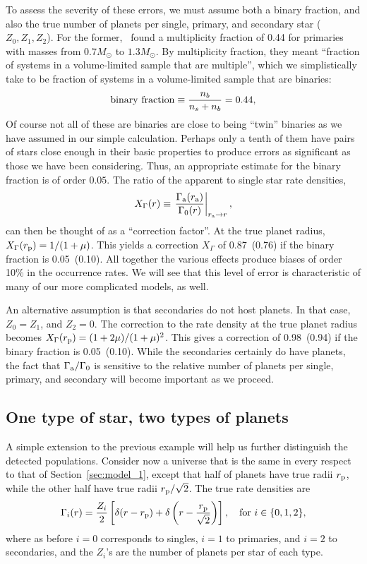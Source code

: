 \documentclass[12pt,modern]{aastex61}
\renewcommand{\a}{_{\rm a}}
\newcommand{\p}{_{\rm p}}
\begin{document}
To assess the severity of these errors, we must assume both a binary fraction, 
and also the true number of planets per single, primary, and secondary star 
($Z_0,Z_1,Z_2$).
For the former,~\citet{raghavan_survey_2010} found a multiplicity 
fraction of 0.44 for primaries with masses from $0.7M_\odot$ to $1.3M_\odot$.
By multiplicity fraction, they meant ``fraction of systems in a volume-limited 
sample that are multiple'', which we simplistically take to be fraction of 
systems in a volume-limited sample that are binaries:
\begin{equation}
{\rm binary\ fraction} \equiv \frac{n_b}{n_s + n_b} = 0.44,
\end{equation}
Of course not all of these are binaries are close to being ``twin'' binaries 
as we have assumed in our simple calculation.
Perhaps only a tenth of them have pairs of stars close enough
in their basic properties to produce errors as significant as those
we have been considering.  Thus, an appropriate estimate
for the binary fraction is of order $0.05$.
The ratio of the apparent to single star rate densities,
\begin{equation}
X_\Gamma(r) \equiv \left. \frac{\Gamma\a(r\a)}{\Gamma_0(r)} \right|_{r\a 
    \rightarrow r},
\end{equation}
can then be thought of as a ``correction factor''.
At the true planet radius, $X_\Gamma(r\p)=1/(1+\mu)$.
This yields a correction $X_\Gamma$ of 0.87~(0.76) if the binary fraction is 
0.05~(0.10).
All together the various effects produce biases of order 10\% in the
occurrence rates.  We will see that this level of error is characteristic
of many of our more complicated models, as well.

An alternative assumption is that secondaries do not host planets. In that 
case, $Z_0=Z_1$, and $Z_2=0$. The correction to the rate density at the true 
planet radius becomes $X_\Gamma(r\p) = (1+2\mu)/(1+\mu)^2$.
This gives a correction of 0.98~(0.94) if the binary fraction is 0.05~(0.10).
While the secondaries certainly do have planets, 
the fact that $\Gamma\a/\Gamma_0$ is sensitive to the relative number 
of planets per single, primary, and secondary will become important as we 
proceed.

\subsection{One type of star, two types of planets}

A simple extension to the previous example will help us further distinguish 
the detected populations.
Consider now a universe that is the same in every respect to that of 
Section~\ref{sec:model_1}, except that half of planets have true radii $r\p$, 
while the other half have true radii $r\p/\sqrt{2}$.
The true rate densities are
\begin{equation}
\Gamma_i(r) = \frac{Z_i}{2} \left[
\delta(r-r\p) + \delta\left(r-\frac{r\p}{\sqrt{2}}\right)
\right], \quad {\rm for}\  i \in \{ 0,1,2 \},
\end{equation}
where as before $i=0$ corresponds to singles, $i=1$ to primaries, and $i=2$ to 
secondaries, and the $Z_i$'s are the number of planets per star of each type.
\end{document}
